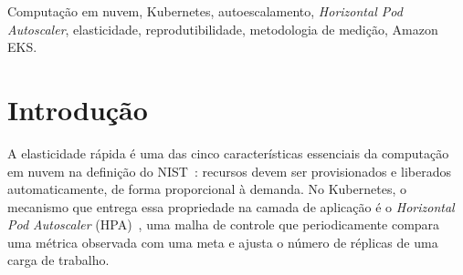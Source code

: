 \documentclass[conference]{IEEEtran}
\begin{document}
\begin{abstract}
\vspace{0.6em}
\noindent\textit{Abstract}---Practitioner comparisons of cloud infrastructure
routinely rest on a single execution per configuration. We show, in a setting
where replication is cheap, how badly that design can fail --- and we show it by
correcting a conclusion of our own. An earlier study deployed an identical
Kubernetes workload with the Horizontal Pod Autoscaler on a local Minikube
cluster and on managed Amazon EKS, executed each deployment once per author, and
observed that the faster environment changed between executions; it concluded
that autoscaling reaction time was not attributable to the platform. This paper
keeps the deployment, the workload and the load protocol unchanged, and changes
only the experimental design: twenty unattended repetitions per environment, with
the primary metric derived exclusively from timestamps assigned by the cluster.
Across forty repetitions with no attrition, reaction time averaged 40.8\,s
locally against 24.7\,s in the cloud (Mann--Whitney $U=52.0$,
$p=1\times10^{-4}$; Cliff's $\delta=0.74$): a real platform effect that the
earlier design could not resolve. A single repetition drawn from each environment
reproduces the correct ordering only 87\,\% of the time, and the four previously
reported observations sit at the 82nd, 10th, 45th and 100th percentiles of the
distributions measured here. None of five recorded covariates predicts which
local repetitions were slow. Everything fixed by declaration replicated to within
a few percent.
\end{abstract}

\begin{IEEEkeywords}
Computação em nuvem, Kubernetes, autoescalamento, \emph{Horizontal Pod
Autoscaler}, elasticidade, reprodutibilidade, metodologia de medição, Amazon EKS.
\end{IEEEkeywords}

\section{Introdução}
\label{sec:intro}

A elasticidade rápida é uma das cinco características essenciais da computação em
nuvem na definição do NIST~\cite{nist}: recursos devem ser provisionados e
liberados automaticamente, de forma proporcional à demanda. No Kubernetes, o
mecanismo que entrega essa propriedade na camada de aplicação é o
\emph{Horizontal Pod Autoscaler} (HPA)~\cite{k8shpa}, uma malha de controle que
periodicamente compara uma métrica observada com uma meta e ajusta o número de
réplicas de uma carga de trabalho.
\end{document}
